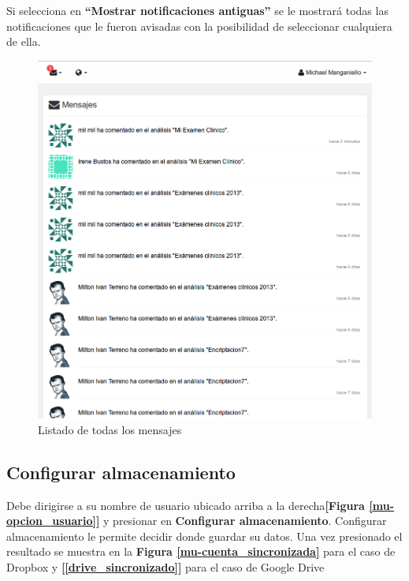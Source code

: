Si selecciona en \textbf{``Mostrar notificaciones antiguas''} se le mostrará todas las notificaciones que le fueron avisadas con la posibilidad de seleccionar cualquiera de ella.

\begin{figure}
	\centering
	\includegraphics[width=.8\textwidth]{img/manual_de_usuario/lista_mensajes}
	\caption{Listado de todas los mensajes}
	\label{mu-lista_mensajes}
\end{figure}




\subsection{Configurar almacenamiento}
Debe dirigirse a su nombre de usuario ubicado arriba a la derecha\textbf{[Figura \ref{mu-opcion_usuario}]} y presionar en \textbf{Configurar almacenamiento}. Configurar almacenamiento le permite decidir donde guardar su datos. Una vez presionado el resultado se muestra en la \textbf{Figura \ref{mu-cuenta_sincronizada}} para el caso de Dropbox y \textbf{[\ref{drive_sincronizado}]} para el caso de Google Drive

